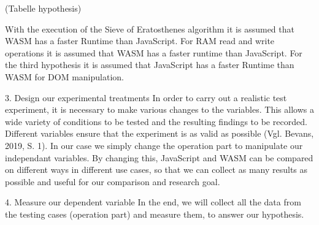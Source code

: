 (Tabelle hypothesis)

With the execution of the Sieve of Eratosthenes algorithm it is assumed that WASM has a faster Runtime than JavaScript.
For RAM read and write operations it is assumed that WASM has a faster runtime than JavaScript.
For the third hypothesis it is assumed that JavaScript has a faster Runtime than WASM for DOM manipulation.

3.	Design our experimental treatments
In order to carry out a realistic test experiment, it is necessary to make various changes to the variables. This allows a wide variety of conditions to be tested and the resulting findings to be recorded. Different variables ensure that the experiment is as valid as possible (Vgl. Bevans, 2019, S. 1).
In our case we simply change the operation part to manipulate our independant variables. By changing this, JavaScript and WASM can be compared on different ways in different use cases, so that we can collect as many results as possible and useful for our comparison and research goal.

4.	Measure our dependent variable
In the end, we will collect all the data from the testing cases (operation part) and measure them, to answer our hypothesis.
